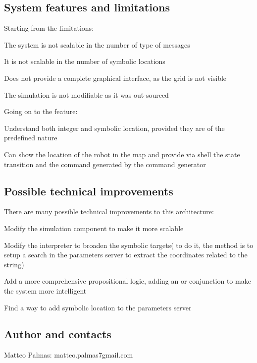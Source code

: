 \subsection*{System features and limitations}

Starting from the limitations\+:
\begin{DoxyItemize}
\item The system is not scalable in the number of type of messages
\item It is not scalable in the number of symbolic locations
\item Does not provide a complete graphical interface, as the grid is not visible
\item The simulation is not modifiable as it was out-\/sourced
\end{DoxyItemize}

Going on to the feature\+:
\begin{DoxyItemize}
\item Understand both integer and symbolic location, provided they are of the predefined nature
\item Can show the location of the robot in the map and provide via shell the state transition and the command generated by the command generator
\end{DoxyItemize}

\subsection*{Possible technical improvements}

There are many possible technical improvements to this architecture\+:
\begin{DoxyItemize}
\item Modify the simulation component to make it more scalable
\item Modify the interpreter to broaden the symbolic targets( to do it, the method is to setup a search in the parameters server to extract the coordinates related to the string)
\item Add a more comprehensive propositional logic, adding an \textquotesingle{}or\textquotesingle{} conjunction to make the system more intelligent
\item Find a way to add symbolic location to the parameters server
\end{DoxyItemize}

\subsection*{Author and contacts}

Matteo Palmas\+: matteo.\+palmas7gmail.\+com 